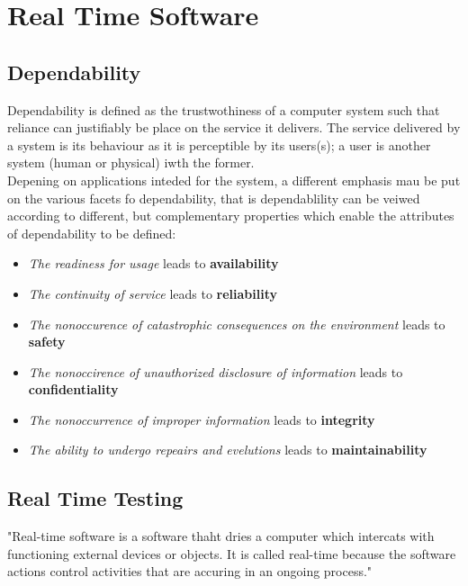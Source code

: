 \chapter{Real Time Software}
\section{Dependability \cite{lyu}}
Dependability is defined as the trustwothiness of a computer system such that reliance can justifiably be place on the service it delivers. The service delivered by a system is its behaviour as it is perceptible by its users(s); a user is another system (human or physical) iwth the former.\\
Depening on applications inteded for the system, a different emphasis mau be put on the various facets fo dependability, that is dependablility can be veiwed according to different, but complementary properties which enable the attributes of dependability to be defined:
\begin{itemize}
	\item \textit{The readiness for usage} leads to \textbf{availability}
	\item \textit{The continuity of service} leads to \textbf{reliability}
	\item \textit{The nonoccurence of catastrophic consequences on the environment} leads to \textbf{safety}
	\item \textit{The nonoccirence of unauthorized disclosure of information} leads to \textbf{confidentiality}
	\item \textit{The nonoccurrence of improper information} leads to \textbf{integrity}
	\item \textit{The ability to undergo repeairs and evelutions} leads to \textbf{maintainability}
\end{itemize}

\section{Real Time Testing}
"Real-time software is a software thaht dries a computer which intercats  with functioning external devices or objects. It is called real-time because the software actions control activities that are accuring in an ongoing process."\cite{RealTimeTesting}
